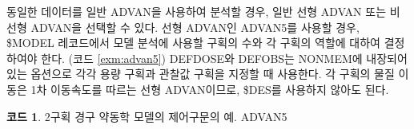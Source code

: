 \documentclass[
  10pt,
  krantz2,
  a4paper]{krantz}
\newenvironment{Shaded}{\begin{snugshade}}{\end{snugshade}}
\newcommand{\DecValTok}[1]{\textcolor[rgb]{0.00,0.00,0.81}{#1}}
\newcommand{\FloatTok}[1]{\textcolor[rgb]{0.00,0.00,0.81}{#1}}
\newcommand{\NormalTok}[1]{#1}
\newcommand{\OperatorTok}[1]{\textcolor[rgb]{0.81,0.36,0.00}{\textbf{#1}}}
\theoremstyle{definition}
\theoremstyle{definition}
\newtheorem{example}{코드}[chapter]
\theoremstyle{definition}
\theoremstyle{remark}
\begin{document}
\begin{Shaded}
\end{Shaded}

동일한 데이터를 일반 ADVAN을 사용하여 분석할 경우, 일반 선형 ADVAN 또는 비선형 ADVAN을 선택할 수 있다. 선형 ADVAN인 ADVAN5를 사용할 경우, \$MODEL 레코드에서 모델 분석에 사용할 구획의 수와 각 구획의 역할에 대하여 결정하여야 한다. (코드 \ref{exm:advan5}) DEFDOSE와 DEFOBS는 NONMEM에 내장되어 있는 옵션으로 각각 용량 구획과 관찰값 구획을 지정할 때 사용한다. 각 구획의 물질 이동은 1차 이동속도를 따르는 선형 ADVAN이므로, \$DES를 사용하지 않아도 된다.

\begin{example}
\protect\hypertarget{exm:advan5}{}{\label{exm:advan5} }2구획 경구 약동학 모델의 제어구문의 예. ADVAN5
\end{example}
\end{document}
